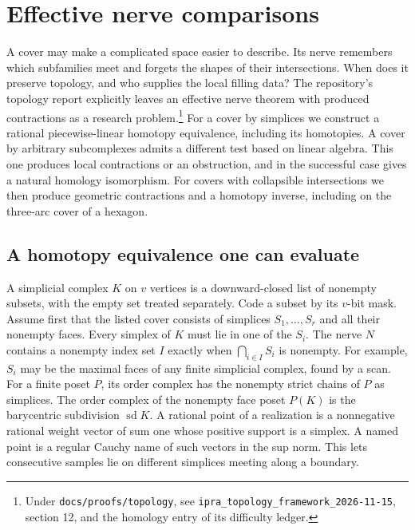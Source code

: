 \section{Effective nerve comparisons}\label{sec:nerve}

A cover may make a complicated space easier to describe. Its nerve remembers
which subfamilies meet and forgets the shapes of their intersections. When does
it preserve topology, and who supplies the local filling data? The repository's
topology report explicitly leaves an effective nerve theorem with produced
contractions as a research problem.\footnote{Under
\texttt{docs/proofs/topology}, see
\texttt{ipra\_topology\_framework\_2026-11-15}, section 12,
and the homology entry of its difficulty ledger.}
For a cover by simplices we construct a rational
piecewise-linear homotopy equivalence, including its homotopies. A cover by
arbitrary subcomplexes admits a different test based on linear algebra. This
one produces local contractions or an obstruction, and in the successful
case gives a natural homology isomorphism. For covers with collapsible intersections we then produce geometric contractions and a homotopy inverse, including on the three-arc cover of a hexagon.

\subsection{A homotopy equivalence one can evaluate}

A simplicial complex $K$ on $v$ vertices is a downward-closed list of
nonempty subsets, with the empty set treated separately. Code a subset by
its $v$-bit mask. Assume first that the listed cover consists of simplices
$S_1,\ldots,S_r$ and all their nonempty faces. Every simplex of $K$ must
lie in one of the $S_i$. The nerve $N$ contains a nonempty index set $I$
exactly when $\bigcap_{i\in I}S_i$ is nonempty. For example, $S_i$ may
be the maximal faces of any finite simplicial complex, found by a scan.
For a finite poset $P$, its order complex has the nonempty strict chains
of $P$ as simplices. The order complex of the nonempty face poset $P(K)$
is the barycentric subdivision $\operatorname{sd}K$. A rational point of a
realization is a nonnegative rational weight vector of sum one whose
positive support is a simplex. A named point is a regular Cauchy name of
such vectors in the sup norm. This lets consecutive samples lie on
different simplices meeting along a boundary.


